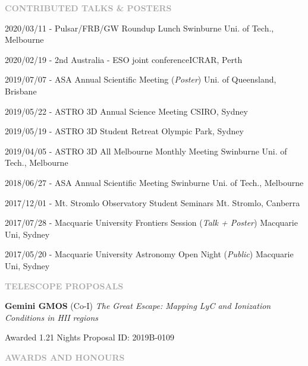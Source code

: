 \documentclass[11pt]{extarticle}
\def\Vhrulefill{{\color{BurntOrange}{\leavevmode\leaders\hrule height 1.2ex depth \dimexpr0.5pt-0.9ex\hfill\kern5pt}}}
\begin{document}
\vspace{3ex}
\noindent
\textcolor{darkgray}{\Large\normalfont\bfseries\MakeUppercase{Contributed Talks \& Posters}} \Vhrulefill
\vspace{2ex}

2020/03/11 - Pulsar/FRB/GW Roundup Lunch \hfill Swinburne Uni. of Tech., Melbourne \par
2020/02/19 - 2nd Australia - ESO joint conference\hfill ICRAR, Perth\par 
2019/07/07 - ASA Annual Scientific Meeting (\emph{Poster}) \hfill Uni. of Queensland, Brisbane \par
2019/05/22 - ASTRO 3D Annual Science Meeting \hfill CSIRO, Sydney \par
2019/05/19 - ASTRO 3D Student Retreat \hfill Olympic Park, Sydney \par 
2019/04/05 - ASTRO 3D All Melbourne Monthly Meeting \hfill Swinburne Uni. of Tech., Melbourne \par
2018/06/27 - ASA Annual Scientific Meeting \hfill Swinburne Uni. of Tech., Melbourne\par
2017/12/01 - Mt. Stromlo Observatory Student Seminars \hfill Mt. Stromlo, Canberra \par
2017/07/28 - Macquarie University Frontiers Session (\emph{Talk + Poster}) \hfill Macquarie Uni, Sydney \par
2017/05/20 - Macquarie University Astronomy Open Night (\emph{Public}) \hfill Macquarie Uni, Sydney \par

\clearpage

\vspace{3ex}
\noindent
\textcolor{darkgray}{\Large\normalfont\bfseries\MakeUppercase{Telescope Proposals}} \Vhrulefill
\vspace{2ex}

\textbf{Gemini GMOS} (Co-I) \emph{The Great Escape: Mapping LyC and Ionization Conditions in HII regions} \par Awarded 1.21 Nights  Proposal ID: 2019B-0109 

\vspace{3ex}
\noindent
\textcolor{darkgray}{\Large\normalfont\bfseries\MakeUppercase{Awards and Honours}} \Vhrulefill
\vspace{2ex}
\end{document}
